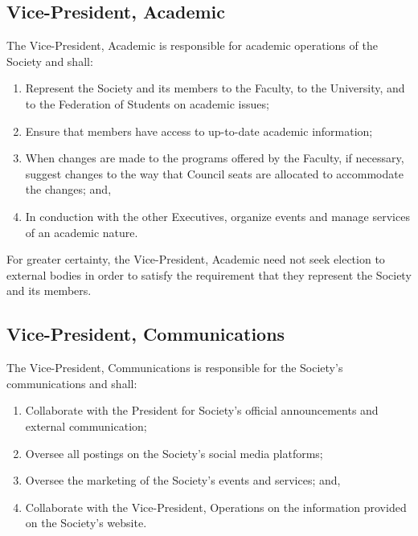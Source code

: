 \subsection{Vice-President, Academic}
The Vice-President, Academic is responsible for academic operations of the
Society and shall:
\begin{enumerate}
  \item Represent the Society and its members to the Faculty, to the University,
    and to the Federation of Students on academic issues;
  \item Ensure that members have access to up-to-date academic information;
  \item When changes are made to the programs offered by the Faculty, if
    necessary, suggest changes to the way that Council seats are allocated to
    accommodate the changes; and,
  \item In conduction with the other Executives, organize events and manage
    services of an academic nature.
\end{enumerate}

For greater certainty, the Vice-President, Academic need not seek election to
external bodies in order to satisfy the requirement that they represent the
Society and its members.

\subsection{Vice-President, Communications}
The Vice-President, Communications is responsible for the Society's 
communications and shall:
\begin{enumerate}
    \item Collaborate with the President for Society's official announcements and external
    communication;
    \item Oversee all postings on the Society's social media platforms;
    \item Oversee the marketing of the Society's events and services; and,
    \item Collaborate with the Vice-President, Operations on the information 
        provided on the Society's website.
\end{enumerate}

